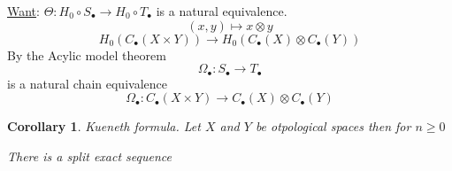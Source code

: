 \documentclass[11pt]{article}
\newtheorem{cor}[thm]{Corollary}
\newcommand{\lrta}{\longrightarrow}
\begin{document}
\underline{Want}: 
$\Theta:H_0\circ S_\bullet\lrta H_0\circ T_\bullet$ is a natural equivalence.
$$
(x,y)\mapsto x\otimes y
$$
$$
H_0(C_\bullet(X\times Y))\lrta H_0(C_\bullet(X)\otimes C_\bullet (Y))
$$
By the Acylic model theorem
$$
\Omega_\bullet: S_\bullet\lrta T_\bullet
$$
 is a natural chain equivalence
 $$
\Omega_\bullet:C_\bullet(X\times Y)\lrta C_\bullet(X)\otimes C_\bullet(Y)
 $$

\begin{cor}
Kueneth formula.
Let $X$ and $Y$  be otpological spaces then for $n\geq0$

There is a split exact sequence
\end{cor}
\end{document}
